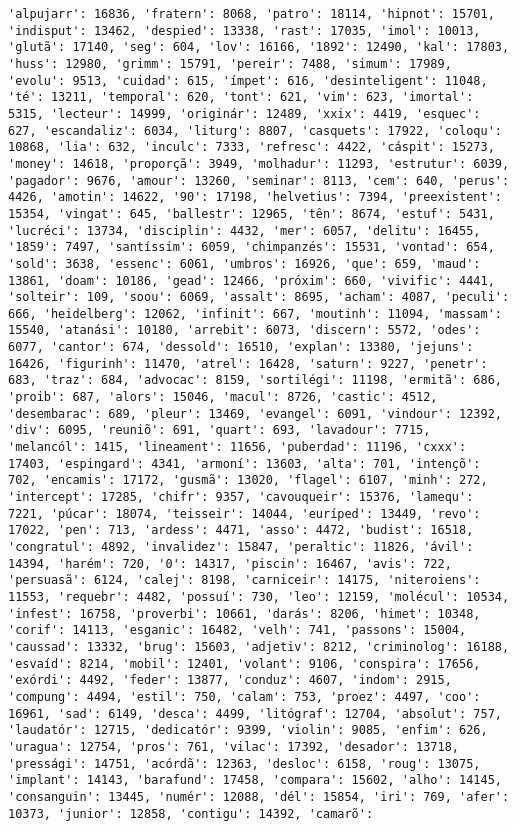 \begin{Verbatim}[commandchars=\\\{\}]
'alpujarr': 16836, 'fratern': 8068, 'patro': 18114, 'hipnot': 15701, 'indisput': 13462, 'despied': 13338, 'rast': 17035, 'imol': 10013, 'glutã': 17140, 'seg': 604, 'lov': 16166, '1892': 12490, 'kal': 17803, 'huss': 12980, 'grimm': 15791, 'pereir': 7488, 'simum': 17989, 'evolu': 9513, 'cuidad': 615, 'ímpet': 616, 'desinteligent': 11048, 'té': 13211, 'temporal': 620, 'tont': 621, 'vim': 623, 'imortal': 5315, 'lecteur': 14999, 'originár': 12489, 'xxix': 4419, 'esquec': 627, 'escandaliz': 6034, 'liturg': 8807, 'casquets': 17922, 'coloqu': 10868, 'lia': 632, 'inculc': 7333, 'refresc': 4422, 'cáspit': 15273, 'money': 14618, 'proporçã': 3949, 'molhadur': 11293, 'estrutur': 6039, 'pagador': 9676, 'amour': 13260, 'seminar': 8113, 'cem': 640, 'perus': 4426, 'amotin': 14622, '90': 17198, 'helvetius': 7394, 'preexistent': 15354, 'vingat': 645, 'ballestr': 12965, 'tên': 8674, 'estuf': 5431, 'lucréci': 13734, 'disciplin': 4432, 'mer': 6057, 'delitu': 16455, '1859': 7497, 'santíssim': 6059, 'chimpanzés': 15531, 'vontad': 654, 'sold': 3638, 'essenc': 6061, 'umbros': 16926, 'que': 659, 'maud': 13861, 'doam': 10186, 'gead': 12466, 'próxim': 660, 'vivific': 4441, 'solteir': 109, 'soou': 6069, 'assalt': 8695, 'acham': 4087, 'peculi': 666, 'heidelberg': 12062, 'infinit': 667, 'moutinh': 11094, 'massam': 15540, 'atanási': 10180, 'arrebit': 6073, 'discern': 5572, 'odes': 6077, 'cantor': 674, 'dessold': 16510, 'explan': 13380, 'jejuns': 16426, 'figurinh': 11470, 'atrel': 16428, 'saturn': 9227, 'penetr': 683, 'traz': 684, 'advocac': 8159, 'sortilégi': 11198, 'ermitã': 686, 'proib': 687, 'alors': 15046, 'macul': 8726, 'castic': 4512, 'desembarac': 689, 'pleur': 13469, 'evangel': 6091, 'vindour': 12392, 'div': 6095, 'reuniõ': 691, 'quart': 693, 'lavadour': 7715, 'melancól': 1415, 'lineament': 11656, 'puberdad': 11196, 'cxxx': 17403, 'espingard': 4341, 'armoní': 13603, 'alta': 701, 'intençõ': 702, 'encamis': 17172, 'gusmã': 13020, 'flagel': 6107, 'minh': 272, 'intercept': 17285, 'chifr': 9357, 'cavouqueir': 15376, 'lamequ': 7221, 'púcar': 18074, 'teisseir': 14044, 'euríped': 13449, 'revo': 17022, 'pen': 713, 'ardess': 4471, 'asso': 4472, 'budist': 16518, 'congratul': 4892, 'invalidez': 15847, 'peraltic': 11826, 'ávil': 14394, 'harém': 720, '0': 14317, 'piscin': 16467, 'avis': 722, 'persuasã': 6124, 'calej': 8198, 'carniceir': 14175, 'niteroiens': 11553, 'requebr': 4482, 'possuí': 730, 'leo': 12159, 'molécul': 10534, 'infest': 16758, 'proverbi': 10661, 'darás': 8206, 'himet': 10348, 'corif': 14113, 'esganic': 16482, 'velh': 741, 'passons': 15004, 'caussad': 13332, 'brug': 15603, 'adjetiv': 8212, 'criminolog': 16188, 'esvaíd': 8214, 'mobil': 12401, 'volant': 9106, 'conspira': 17656, 'exórdi': 4492, 'feder': 13877, 'conduz': 4607, 'indom': 2915, 'compung': 4494, 'estil': 750, 'calam': 753, 'proez': 4497, 'coo': 16961, 'sad': 6149, 'desca': 4499, 'litógraf': 12704, 'absolut': 757, 'laudatór': 12715, 'dedicatór': 9399, 'violin': 9085, 'enfim': 626, 'uragua': 12754, 'pros': 761, 'vilac': 17392, 'desador': 13718, 'pressági': 14751, 'acórdã': 12363, 'desloc': 6158, 'roug': 13075, 'implant': 14143, 'barafund': 17458, 'compara': 15602, 'alho': 14145, 'consanguin': 13445, 'numér': 12088, 'dél': 15854, 'iri': 769, 'afer': 10373, 'junior': 12858, 'contigu': 14392, 'camarõ': 
\end{Verbatim}
